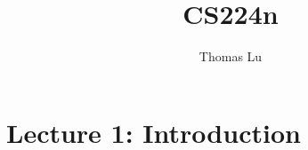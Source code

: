 \documentclass{article}
\title{CS224n}
\author{Thomas Lu}
\date{}
\begin{document}
\maketitle
\section{Lecture 1: Introduction}

\end{document}
